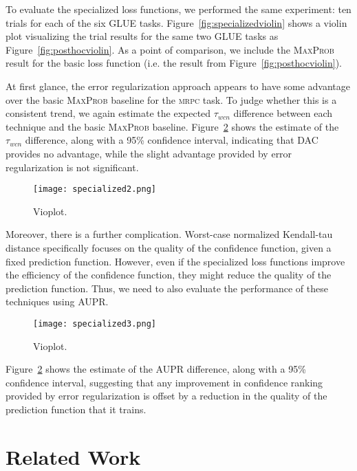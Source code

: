\documentclass[11pt]{article}
\begin{document}
To evaluate the specialized loss functions, we performed the same experiment: ten trials for each of the six GLUE tasks. Figure~\ref{fig:specializedviolin} shows a violin plot visualizing the trial results for the same two GLUE tasks as Figure~\ref{fig:posthocviolin}. As a point of comparison, we include the \textsc{MaxProb} result for the basic loss function (i.e. the result from Figure~\ref{fig:posthocviolin}). 

At first glance, the error regularization approach appears to have some advantage over the basic \textsc{MaxProb} baseline for the \textsc{mrpc} task. To judge whether this is a consistent trend, we again estimate the expected $\tau_{wcn}$ difference between each technique and the basic \textsc{MaxProb} baseline. Figure~\ref{fig:specializedpointplot1} shows the estimate of the $\tau_{wcn}$ difference, along with a 95\% confidence interval, indicating that DAC provides no advantage, while the slight advantage provided by error regularization is not significant. 

\begin{figure}
\centering
\texttt{[image: specialized2.png]}
\caption{Vioplot.}
\label{fig:specializedpointplot1}
\end{figure}

Moreover, there is a further complication. Worst-case normalized Kendall-tau distance specifically focuses on the quality of the confidence function, given a fixed prediction function. However, even if the specialized loss functions improve the efficiency of the confidence function, they might reduce the quality of the prediction function. Thus, we need to also evaluate the performance of these techniques using AUPR. 

\begin{figure}
\centering
\texttt{[image: specialized3.png]}
\caption{Vioplot.}
\label{fig:specializedpointplot1}
\end{figure}

Figure~\ref{fig:specializedpointplot1} shows the estimate of the AUPR difference, along with a 95\% confidence interval, suggesting that any improvement in confidence ranking provided by error regularization is offset by a reduction in the quality of the prediction function that it trains.


\section{Related Work}
\end{document}
